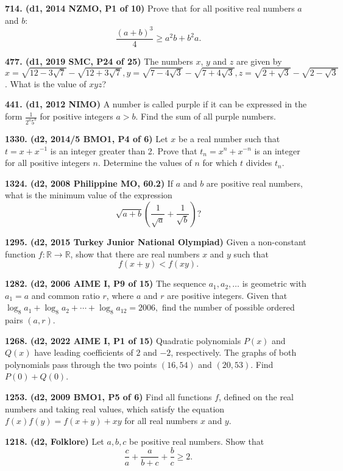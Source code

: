 \documentclass{article}
\begin{document}
\textbf{714. (\color{red}d1\color{black}, 2014 NZMO, P1 of 10)} Prove that for all positive real numbers \(a\) and \(b\): \[\frac{(a+b)^3}{4} \geq a^2b + b^2a.\]

\textbf{477. (\color{red}d1\color{black}, 2019 SMC, P24 of 25)} The numbers $x$, $y$ and $z$ are given by $x=\sqrt{12-3\sqrt7}-\sqrt{12+3\sqrt7}, y=\sqrt{7-4\sqrt3}-\sqrt{7+4\sqrt3}, z=\sqrt{2+\sqrt3}-\sqrt{2-\sqrt3}$.
What is the value of $xyz$?

\textbf{441. (\color{red}d1\color{black}, 2012 NIMO)} A number is called purple if it can be expressed in the form $\frac{1}{2^{a} 5^{b}}$ for positive integers $a>b$. Find the sum of all purple numbers.

\textbf{1330. (\color{red}d2\color{black}, 2014/5 BMO1, P4 of 6)} Let $x$ be a real number such that $t=x+x^{-1}$ is an integer greater than 2. Prove that $t_n=x^n+x^{-n}$ is an integer for all positive integers $n$. Determine the values of $n$ for which $t$ divides $t_n$.

\textbf{1324. (\color{red}d2\color{black}, 2008 Philippine MO, 60.2)} If $a$ and $b$ are positive real numbers, what is the minimum value of the expression$$\sqrt{a+b} ( \frac{1}{\sqrt{a}}+\frac{1}{\sqrt{b}} ) ?$$

\textbf{1295. (\color{red}d2\color{black}, 2015 Turkey Junior National Olympiad)} Given a non-constant function $f : \mathbb{R} \to \mathbb{R}$, show that there are real numbers $x$ and $y$ such that \begin{equation*}f(x+y) < f(xy).\end{equation*}

\textbf{1282. (\color{red}d2\color{black}, 2006 AIME I, P9 of 15)} The sequence $a_1, a_2, \ldots$ is geometric with $a_1=a$ and common ratio $r$, where $a$ and $r$ are positive integers. Given that $\log_8 a_1+\log_8 a_2+\cdots+\log_8 a_{12} = 2006,$ find the number of possible ordered pairs $(a,r)$.

\textbf{1268. (\color{red}d2\color{black}, 2022 AIME I, P1 of 15)} Quadratic polynomials $P(x)$ and $Q(x)$ have leading coefficients of $2$ and $-2$, respectively. The graphs of both polynomials pass through the two points $(16,54)$ and $(20,53)$. Find ${P(0) + Q(0)}$.

\textbf{1253. (\color{red}d2\color{black}, 2009 BMO1, P5 of 6)} Find all functions $f$, defined on the real numbers and taking real values, which satisfy the equation $f(x)f(y) = f(x+y) + xy$ for all real numbers $x$ and $y$.

\textbf{1218. (\color{red}d2\color{black}, Folklore)} Let $a, b, c$ be positive real numbers. Show that \begin{equation*}\frac{c}{a} + \frac{a}{b+c} + \frac{b}{c} \ge 2.\end{equation*}
\end{document}
